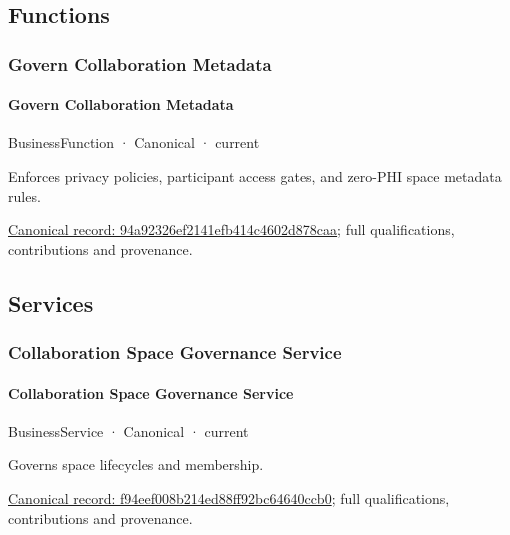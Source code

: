 \subsection{Functions}

\subsubsection{Govern Collaboration Metadata}

\paragraph{Govern Collaboration Metadata}

\label{element:94a92326ef2141efb414c4602d878caa}
{\small BusinessFunction · Canonical · current}\par

Enforces privacy policies, participant access gates, and zero-PHI space metadata rules.


{\footnotesize \href{../../../../continuum/business/business-function/94a92326ef2141efb414c4602d878caa.md}{Canonical record: 94a92326ef2141efb414c4602d878caa}; full qualifications, contributions and provenance.}\par
\subsection{Services}

\subsubsection{Collaboration Space Governance Service}

\paragraph{Collaboration Space Governance Service}

\label{element:f94eef008b214ed88ff92bc64640ccb0}
{\small BusinessService · Canonical · current}\par

Governs space lifecycles and membership.


{\footnotesize \href{../../../../continuum/business/business-service/f94eef008b214ed88ff92bc64640ccb0.md}{Canonical record: f94eef008b214ed88ff92bc64640ccb0}; full qualifications, contributions and provenance.}\par
